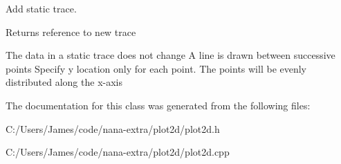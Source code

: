 Add static trace. 

\begin{DoxyReturn}{Returns}
reference to new trace
\end{DoxyReturn}
The data in a static trace does not change A line is drawn between successive points Specify y location only for each point. The points will be evenly distributed along the x-\/axis 

The documentation for this class was generated from the following files\-:\begin{DoxyCompactItemize}
\item 
C\-:/\-Users/\-James/code/nana-\/extra/plot2d/plot2d.\-h\item 
C\-:/\-Users/\-James/code/nana-\/extra/plot2d/plot2d.\-cpp\end{DoxyCompactItemize}
